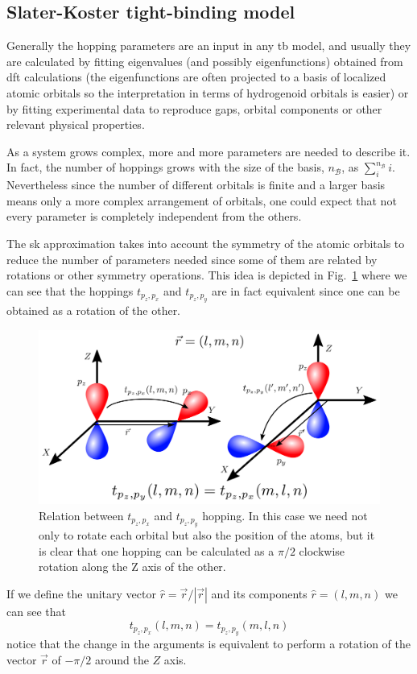 \subsection{Slater-Koster tight-binding model}
\label{ssec:SK}
Generally the hopping parameters are an input in any \ac{tb} model, and usually they are calculated by fitting eigenvalues (and possibly eigenfunctions) obtained from \ac{dft} calculations (the eigenfunctions are often projected to a basis of localized atomic orbitals so the interpretation in terms of hydrogenoid orbitals is easier) or by fitting experimental data to reproduce gaps, orbital components or other relevant physical properties.

As a system grows complex, more and more parameters are needed to describe it. In fact, the number of hoppings grows with the size of the basis, $n_\mathcal{B}$, as $\sum^{n_\mathcal{B}}_i i$. Nevertheless since the number of different orbitals is finite and a larger basis means only a more complex arrangement of orbitals, one could expect that not every parameter is completely independent from the others.

The \ac{sk} approximation\cite{Slater1954} takes into account the symmetry of the atomic orbitals to reduce the number of parameters needed since some of them are related by rotations or other symmetry operations.
This idea is depicted in Fig.~\ref{complex} where we can see that the hoppings $t_{p_{z},p_{x}}$ and $t_{p_{z},p_{y}}$ are in fact equivalent since one can be obtained as a rotation of the other.
\begin{figure}[h!]
  \centering
  \includegraphics{chapter04/figures/complex.png}
  \vspace{-5pt}
  \caption{Relation between $t_{p_{z},p_{x}}$ and $t_{p_{z},p_{y}}$ hopping. In this case we need not only to rotate each orbital but also the position of the atoms, but it is clear that one hopping can be calculated as a $\pi/2$ clockwise rotation along the Z axis of the other.}
\label{complex}
\end{figure}
\FloatBarrier
If we define the unitary vector $\hat{r} = \vec{r}/|\vec{r}|$ and its components $\hat{r}=(l,m,n)$ we can see that
\begin{equation}
  t_{p_{z},p_{x}} (l,m,n) = t_{p_{z},p_{y}}(m,l,n)
\end{equation}
notice that the change in the arguments is equivalent to perform a rotation of the vector $\vec{r}$ of $-\pi/2$ around the $Z$ axis.


